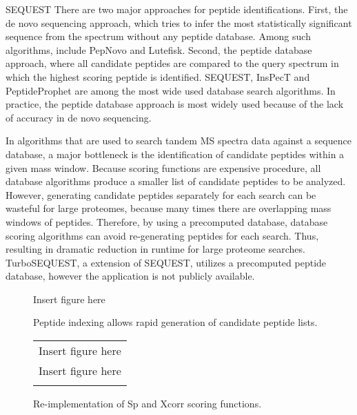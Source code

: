 \documentclass{bioinfo}
\begin{document}
SEQUEST\citep{eng:approach} There are two major approaches for peptide
identifications. First, the de novo sequencing approach, which tries
to infer the most statistically significant sequence from the spectrum
without any peptide database. Among such algorithms, include PepNovo
and Lutefisk. Second, the peptide database approach, where all
candidate peptides are compared to the query spectrum in which the
highest scoring peptide is identified. SEQUEST, InsPecT and
PeptideProphet are among the most wide used database search
algorithms. In practice, the peptide database approach is most widely
used because of the lack of accuracy in de novo sequencing.

In algorithms that are used to search tandem MS spectra data against a
sequence database, a major bottleneck is the identification of
candidate peptides within a given mass window. Because scoring
functions are expensive procedure, all database algorithms produce a
smaller list of candidate peptides to be analyzed. However, generating
candidate peptides separately for each search can be wasteful for
large proteomes, because many times there are overlapping mass windows
of peptides. Therefore, by using a precomputed database, database
scoring algorithms can avoid re-generating peptides for each
search. Thus, resulting in dramatic reduction in runtime for large
proteome searches. TurboSEQUEST, a extension of SEQUEST, utilizes a
precomputed peptide database, however the application is not publicly
available.



\begin{figure}
  \centering
  Insert figure here
  \caption{Peptide indexing allows rapid generation of candidate peptide
  lists.}
  \label{figure:indexing}
\end{figure}

\begin{figure}
  \centering
  \begin{tabular}{c}
  Insert figure here \\
  Insert figure here \\
  \caption{Re-implementation of Sp and Xcorr scoring functions.}
  \label{figure:indexing}
  \end{tabular}
\end{figure}
\end{document}
